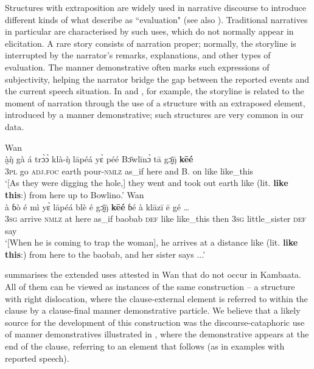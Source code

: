 \documentclass[output=paper,colorlinks,citecolor=brown]{langscibook}
\begin{document}
Structures with extraposition are widely used in narrative discourse to introduce different kinds of what \citet{LabovWaletzky1967} describe as “evaluation" (see also \citealt{Labov1972}). Traditional narratives in particular are characterised by such uses, which do not normally appear in elicitation. A rare story consists of narration proper; normally, the storyline is interrupted by the narrator’s remarks, explanations, and other types of evaluation. The manner demonstrative often marks such expressions of subjectivity, helping the narrator bridge the gap between the reported events and the current speech situation. In  and , for example, the storyline is related to the moment of narration through the use of a structure with an extraposed element, introduced by a manner demonstrative; such structures are very common in our data.


\ea\label{ex:nikitina:20}
\ea\label{ex:nikitina:20a} {Wan}\\
\gll à̰\`{ŋ} gà á tr\`{ɔ}\`{ɔ} klà-\`{ŋ} lāpéá y\`{ɛ} péé B\={ɔ}wlīn\`{ɔ} tā g\={ɔ̰}\={ŋ} \textbf{kēé}\\
     \textsc{3pl} go \textsc{adj.foc} earth pour-\textsc{nmlz} as\_if here and B. on like like\_this\\
\glt ‘[As they were digging the hole,] they went and took out earth like (lit. \textbf{like} \textbf{this}:) from here up to Bowlino.’
\ex\label{ex:nikitina:20b} {Wan}\\
\gll à ɓò é mì y\`{ɛ} lāpéá blè é g\={ɔ̰}\={ŋ} \textbf{kēé} ɓé à klāzī ē gé …\\
     \textsc{3sg} arrive \textsc{nmlz} at here as\_if baobab \textsc{def} like like\_this then \textsc{3sg} little\_sister \textsc{def} say\\
\glt ‘[When he is coming to trap the woman], he arrives at a distance like (lit. \textbf{like} \textbf{this}:) from here to the baobab, and her sister says ...’
\z
\z

 summarises the extended uses attested in Wan that do not occur in Kambaata. All of them can be viewed as instances of the same construction – a structure with right dislocation, where the clause-external element is referred to within the clause by a clause-final manner demonstrative particle. We believe that a likely source for the development of this construction was the discourse-cataphoric use of manner demonstratives illustrated in , where the demonstrative appears at the end of the clause, referring to an element that follows (as in examples with reported speech).
\end{document}
